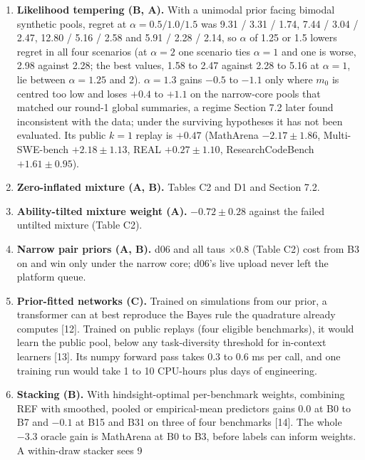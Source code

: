 \documentclass[
]{article}
\begin{document}
\begin{enumerate}
  as shrinkage toward a level prior that is not centred for every
  benchmark (1 of 15 gives 0.086 exact against 0.119 Laplace), so it
  would pay only after a joint re-tuning of the level block.
\item
  \textbf{Likelihood tempering (B, A).} With a unimodal prior facing
  bimodal synthetic pools, regret at \(\alpha = 0.5 / 1.0
  / 1.5\) was 9.31 / 3.31 / 1.74, 7.44 / 3.04 / 2.47, 12.80 / 5.16 /
  2.58 and 5.91 / 2.28 / 2.14, so \(\alpha\) of 1.25 or 1.5 lowers
  regret in all four scenarios (at \(\alpha = 2\) one scenario ties
  \(\alpha = 1\) and one is worse, 2.98 against 2.28; the best values,
  1.58 to 2.47 against 2.28 to 5.16 at \(\alpha = 1\), lie between
  \(\alpha = 1.25\) and 2). \(\alpha = 1.3\) gains \(-0.5\) to \(-1.1\)
  only where \(m_0\) is centred too low and loses \(+0.4\) to \(+1.1\)
  on the narrow-core pools that matched our round-1 global summaries, a
  regime Section 7.2 later found inconsistent with the data; under the
  surviving hypotheses it has not been evaluated. Its public \(k = 1\)
  replay is \(+0.47\) (MathArena \(-2.17 \pm 1.86\), Multi-SWE-bench
  \(+2.18 \pm 1.13\), REAL \(+0.27 \pm 1.10\), ResearchCodeBench
  \(+1.61 \pm 0.95\)).
\item
  \textbf{Zero-inflated mixture (A, B).} Tables C2 and D1 and Section
  7.2.
\item
  \textbf{Ability-tilted mixture weight (A).} \(-0.72 \pm 0.28\) against
  the failed untilted mixture (Table C2).
\item
  \textbf{Narrow pair priors (A, B).} d06 and all taus \(\times 0.8\)
  (Table C2) cost from B3 on and win only under the narrow core; d06's
  live upload never left the platform queue.
\item
  \textbf{Prior-fitted networks (C).} Trained on simulations from our
  prior, a transformer can at best reproduce the Bayes rule the
  quadrature already computes {[}12{]}. Trained on public replays (four
  eligible benchmarks), it would learn the public pool, below any
  task-diversity threshold for in-context learners {[}13{]}. Its numpy
  forward pass takes 0.3 to 0.6 ms per call, and one training run would
  take 1 to 10 CPU-hours plus days of engineering.
\item
  \textbf{Stacking (B).} With hindsight-optimal per-benchmark weights,
  combining REF with smoothed, pooled or empirical-mean predictors gains
  0.0 at B0 to B7 and \(-0.1\) at B15 and B31 on three of four
  benchmarks {[}14{]}. The whole \(-3.3\) oracle gain is MathArena at B0
  to B3, before labels can inform weights. A within-draw stacker sees 9

\end{enumerate}
\end{document}
